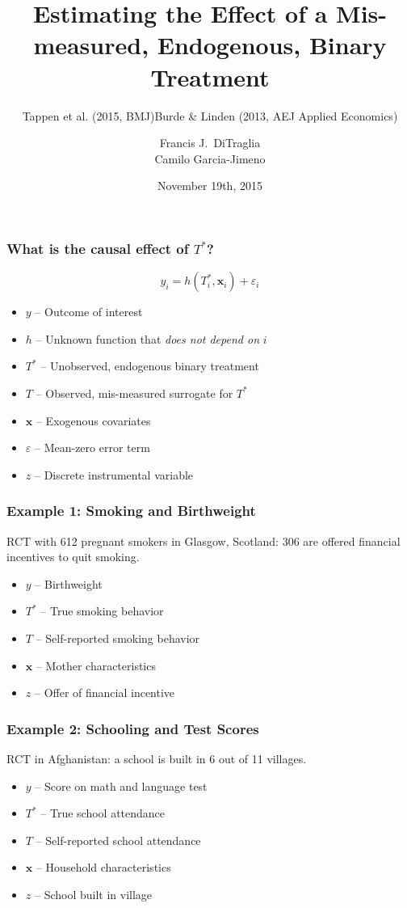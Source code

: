 \documentclass{beamer}
\title[Binary Regressors]{Estimating the Effect of a Mis-measured, Endogenous, Binary Treatment}
\author[FJ DiTraglia]{Francis J.\ DiTraglia\\ Camilo Garcia-Jimeno}
\institute{University of Pennsylvania}
\date{November 19th, 2015}
\begin{document}
 

\begin{frame}[plain]
	\titlepage 
\end{frame} 
\begin{frame}
  \frametitle{What is the causal effect of $T^*$?}
  \[ y_i = h(T^*_i, \mathbf{x}_i) + \varepsilon_i\]
  \begin{itemize}
    \item $y$ -- Outcome of interest
    \item $h$ -- Unknown function that \emph{does not depend on} $i$
    \item $T^*$ -- Unobserved, endogenous binary treatment
    \item $T$ -- Observed, mis-measured surrogate for $T^*$
    \item $\mathbf{x}$ -- Exogenous covariates
    \item $\varepsilon$ -- Mean-zero error term
    \item $z$ -- Discrete instrumental variable
  \end{itemize}
\end{frame}
\begin{frame}
  \frametitle{Example 1: Smoking and Birthweight}
\subtitle{Tappen et al. (2015, BMJ)}
  RCT with 612 pregnant smokers in Glasgow, Scotland: 306 are offered financial incentives to quit smoking.
\begin{itemize}
  \item $y$ -- Birthweight 
  \item $T^*$ -- True smoking behavior 
  \item $T$ -- Self-reported smoking behavior
  \item $\mathbf{x}$ -- Mother characteristics
  \item $z$ -- Offer of financial incentive
\end{itemize}
   
\end{frame}
\begin{frame}
  \frametitle{Example 2: Schooling and Test Scores}
\subtitle{Burde \& Linden (2013, AEJ Applied Economics)}
  RCT in Afghanistan: a school is built in 6 out of 11 villages.
\begin{itemize}
  \item $y$ -- Score on math and language test 
  \item $T^*$ -- True school attendance
  \item $T$ -- Self-reported school attendance
  \item $\mathbf{x}$ -- Household characteristics
  \item $z$ -- School built in village
\end{itemize}
   
\end{frame}
\end{document}
